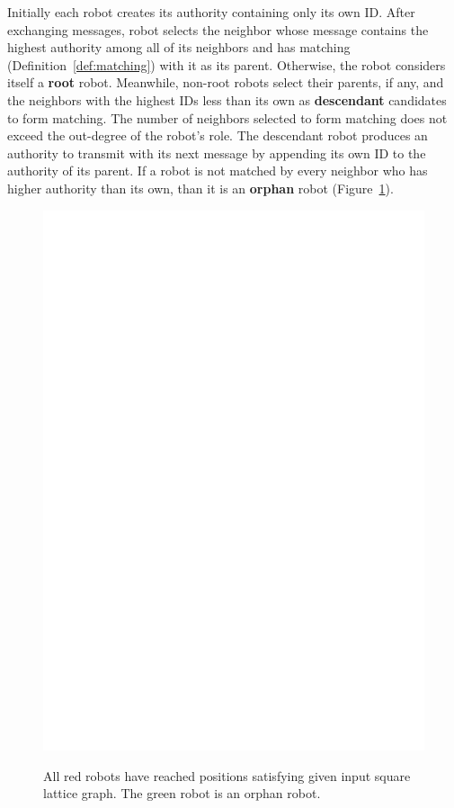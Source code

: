 Initially each robot creates its authority containing only its own ID. 
%
After exchanging messages, robot selects the neighbor whose message contains the highest authority among all of its neighbors and has matching
(Definition~\ref{def:matching}) with it as its parent. 
%
Otherwise, the robot considers itself a \textbf{root} robot. 
%
Meanwhile, non-root robots select their parents, if any, and the neighbors with the highest IDs less than its own as \textbf{descendant} candidates to form matching. 
%
The number of neighbors selected to form matching does not exceed the out-degree of the robot's role. 
%
The descendant robot produces an authority to transmit with its next message by appending its own ID to the authority of its parent. 
%
If a robot is not matched by every neighbor who has higher authority than its own, than it is an \textbf{orphan} robot (Figure~\ref{fig:orphan}).
\begin{figure}
  \centering
  \includegraphics[scale=0.75]{figs/sq17}
  \label{fig:orphan}
  \caption{All red robots have reached positions satisfying given input square lattice graph.
           The green robot is an orphan robot.}
\end{figure}

